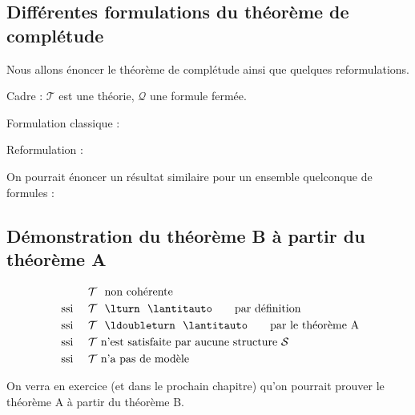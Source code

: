\documentclass[11pt,class=report,crop=false]{standalone}
\begin{document}
\subsection{Différentes formulations du théorème de complétude}

Nous allons énoncer le théorème de complétude ainsi que quelques reformulations.

Cadre : $\mathcal{T}$ est une théorie, $\mathcal{Q}$ une formule fermée.

Formulation classique :
\begin{theoreme}[Théorème A] 
	\sauteligne
{}	
\end{theoreme}

Reformulation :
\begin{theoreme}[Théorème B] 
	\sauteligne
\end{theoreme}

On pourrait énoncer un résultat similaire pour un ensemble quelconque de formules :

\subsection{Démonstration du théorème B à partir du théorème A}

\begin{align*}
	&  \mathcal{T} \ \text{ non cohérente}\\
	\text{ ssi } \quad 	& \mathcal{T} \ \ \lturn \ \ \lantitauto \qquad \text{par définition}\\
	\text{ ssi } \quad 	&  \mathcal{T} \ \ \ldoubleturn \ \ \lantitauto  \qquad \text{par le théorème A}\\
	\text{ ssi } \quad 	&  \mathcal{T} \ \text{n'est satisfaite par aucune structure $\mathcal{S}$}\\	
	\text{ ssi } \quad 	&  \mathcal{T} \ \text{n'a pas de modèle}
\end{align*} 

On verra en exercice (et dans le prochain chapitre) qu'on pourrait prouver le théorème A à partir du théorème B.
\end{document}
